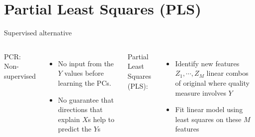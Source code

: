 \documentclass[aspectratio=169,usenames,dvipsnames]{beamer}
\newcommand{\InstructorList}[1]{
\begin{itemize}
	\color{orange}
	#1
\end{itemize}
}
\begin{document}



\section{Partial Least Squares (PLS)}



\begin{frame}[t]{Supervised alternative}

\begin{columns}
\centering
PCR: Non-supervised
\InstructorList{
\item No input from the $Y$ values before learning the PCs.
\item No guarantee that directions that explain $X$s help to predict the $Y$s
}
\centering
Partial Least Squares (PLS):
\InstructorList{
	\item Identify new features $Z_1,\cdots,Z_M$ linear combos of original where quality measure involves $Y$
	\item Fit linear model using least squares on these $M$ features
}
\end{columns}

\end{frame}
\end{document}
